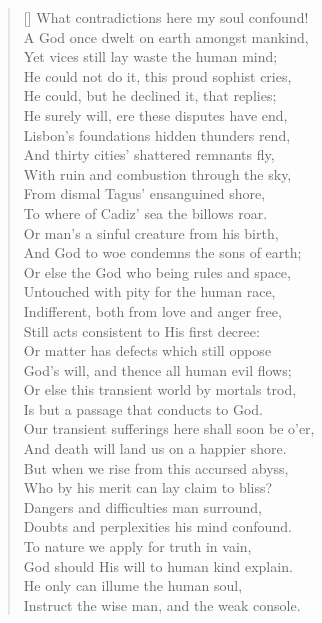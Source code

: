 \begin{verse}[\versewidth]
What contradictions here my soul confound!\\
A God once dwelt on earth amongst mankind,\\
Yet vices still lay waste the human mind;\\
He could not do it, this proud sophist cries,\\
He could, but he declined it, that replies;\\
He surely will, ere these disputes have end,\\
Lisbon's foundations hidden thunders rend,\\
And thirty cities' shattered remnants fly,\\
With ruin and combustion through the sky,\\
From dismal Tagus' ensanguined shore,\\
To where of Cadiz' sea the billows roar.\\
Or man's a sinful creature from his birth,\\
And God to woe condemns the sons of earth;\\
Or else the God who being rules and space,\\
Untouched with pity for the human race,\\
Indifferent, both from love and anger free,\\
Still acts consistent to His first decree:\\
Or matter has defects which still oppose\\
God's will, and thence all human evil flows;\\
Or else this transient world by mortals trod,\\
Is but a passage that conducts to God.\\
Our transient sufferings here shall soon be o'er,\\
And death will land us on a happier shore.\\
But when we rise from this accursed abyss,\\
Who by his merit can lay claim to bliss?\\
Dangers and difficulties man surround,\\
Doubts and perplexities his mind confound.\\
To nature we apply for truth in vain,\\
God should His will to human kind explain.\\
He only can illume the human soul,\\
Instruct the wise man, and the weak console.\\

\end{verse}
